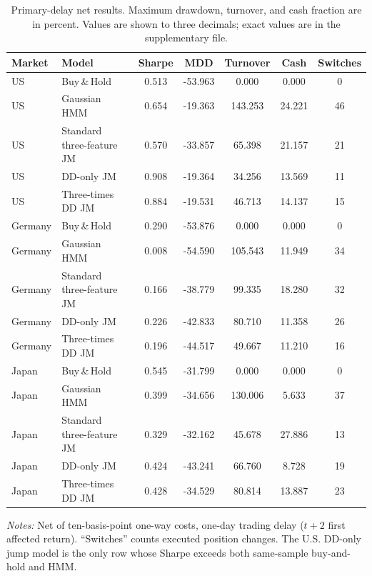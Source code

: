 \documentclass[11pt]{article}
\newcommand{\BH}{Buy\,\&\,Hold}
\begin{document}
\begin{table}[t]
\centering
\caption{Primary-delay net results. Maximum drawdown, turnover, and cash fraction
are in percent. Values are shown to three decimals; exact values are in the
supplementary file.}
\label{tab:mainresults}
\small
\begin{threeparttable}
\begin{tabular}{l l
  S[table-format=1.3]
  S[table-format=-2.3]
  S[table-format=3.3]
  S[table-format=2.3]
  S[table-format=2.0]}
\toprule
Market & Model & {Sharpe} & {MDD} & {Turnover} & {Cash} & {Switches} \\
\midrule
US & \BH{}                    & 0.513 & -53.963 & 0.000   & 0.000  & 0 \\
US & Gaussian HMM             & 0.654 & -19.363 & 143.253 & 24.221 & 46 \\
US & Standard three-feature JM& 0.570 & -33.857 & 65.398  & 21.157 & 21 \\
US & DD-only JM               & 0.908 & -19.364 & 34.256  & 13.569 & 11 \\
US & Three-times DD JM        & 0.884 & -19.531 & 46.713  & 14.137 & 15 \\
\addlinespace
Germany & \BH{}                    & 0.290 & -53.876 & 0.000   & 0.000  & 0 \\
Germany & Gaussian HMM             & 0.008 & -54.590 & 105.543 & 11.949 & 34 \\
Germany & Standard three-feature JM& 0.166 & -38.779 & 99.335  & 18.280 & 32 \\
Germany & DD-only JM               & 0.226 & -42.833 & 80.710  & 11.358 & 26 \\
Germany & Three-times DD JM        & 0.196 & -44.517 & 49.667  & 11.210 & 16 \\
\addlinespace
Japan & \BH{}                    & 0.545 & -31.799 & 0.000   & 0.000  & 0 \\
Japan & Gaussian HMM             & 0.399 & -34.656 & 130.006 & 5.633  & 37 \\
Japan & Standard three-feature JM& 0.329 & -32.162 & 45.678  & 27.886 & 13 \\
Japan & DD-only JM               & 0.424 & -43.241 & 66.760  & 8.728  & 19 \\
Japan & Three-times DD JM        & 0.428 & -34.529 & 80.814  & 13.887 & 23 \\
\bottomrule
\end{tabular}
\begin{tablenotes}[flushleft]\footnotesize
\item \emph{Notes:} Net of ten-basis-point one-way costs, one-day trading delay
($t+2$ first affected return). ``Switches'' counts executed position changes.
The U.S. DD-only jump model is the only row whose Sharpe exceeds both
same-sample buy-and-hold and HMM.
\end{tablenotes}
\end{threeparttable}
\end{table}
\end{document}
